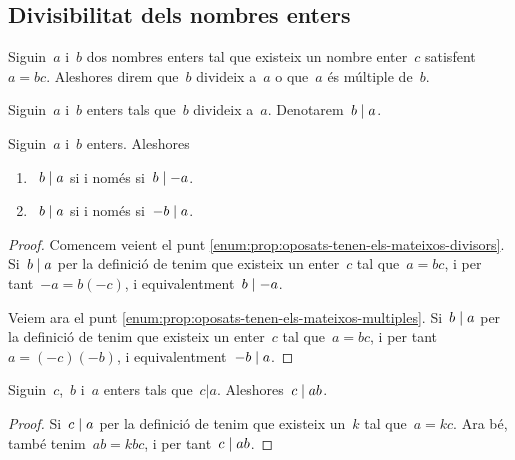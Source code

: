 \documentclass[../fonaments-de-les-matematiques.tex]{subfiles}
\begin{document}
    \subsection{Divisibilitat dels nombres enters}
    \begin{definition}
        \label{def:divisor-Z}
        \label{def:multiple-Z}
        Siguin~\(a\) i~\(b\) dos nombres enters tal que existeix un nombre enter~\(c\) satisfent~\(a=bc\).
        Aleshores direm que~\(b\) divideix a~\(a\) o que~\(a\) és múltiple de~\(b\).
    \end{definition}
    \begin{notation}
        Siguin~\(a\) i~\(b\) enters tals que~\(b\) divideix a~\(a\).
        Denotarem~\(b\mathrel{|} a\).
    \end{notation}
    \begin{proposition}
        \label{prop:oposats-tenen-els-mateixos-divisors}
        \label{prop:oposats-tenen-els-mateixos-multiples}
        Siguin~\(a\) i~\(b\) enters.
        Aleshores
        \begin{enumerate}
            \item\label{enum:prop:oposats-tenen-els-mateixos-divisors}~\(b\mathrel{|} a\) si i només si~\(b\mathrel{|}-a\).
            \item\label{enum:prop:oposats-tenen-els-mateixos-multiples}~\(b\mathrel{|} a\) si i només si~\(-b\mathrel{|} a\).
        \end{enumerate}
    \end{proposition}
    \begin{proof}
        Comencem veient el punt \eqref{enum:prop:oposats-tenen-els-mateixos-divisors}.
        Si~\(b\mathrel{|} a\) per la definició de  tenim que existeix un enter~\(c\) tal que~\(a=bc\), i per tant~\(-a=b(-c)\), i equivalentment~\(b\mathrel{|}-a\).

        Veiem ara el punt \eqref{enum:prop:oposats-tenen-els-mateixos-multiples}.
        Si~\(b\mathrel{|} a\) per la definició de  tenim que existeix un enter~\(c\) tal que~\(a=bc\), i per tant~\(a=(-c)(-b)\), i equivalentment~\(-b\mathrel{|} a\).
    \end{proof}
    \begin{proposition}
        \label{prop:divisors-divideixen-el-divident-escalat}
        Siguin~\(c\),~\(b\) i~\(a\) enters tals que~\(c|a\).
        Aleshores~\(c\mathrel{|} ab\).
    \end{proposition}
    \begin{proof}
        Si~\(c\mathrel{|} a\) per la definició de  tenim que existeix un~\(k\) tal que~\(a=kc\).
        Ara bé, també tenim~\(ab=kbc\), i per tant~\(c\mathrel{|} ab\).
    \end{proof}
\end{document}
